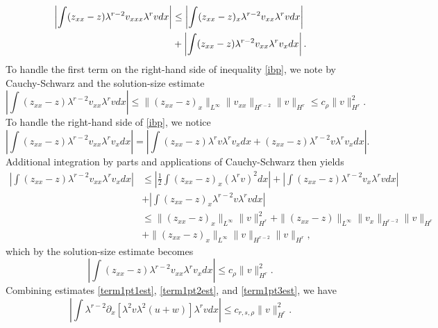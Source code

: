 \documentclass[reqno]{amsart}
\theoremstyle{plain}
\numberwithin{equation}{section}
\begin{document}
    \begin{align}\label{ibp}
        \left| \int (z_{xx}-z)\lambda^{r-2} v_{xxx}\lambda^{r}vdx \right|  & \leq \left| \int (z_{xx}-z)_x\lambda^{r-2} v_{xx}\lambda^{r}vdx \right|  \notag
        \\ & + \left| \int (z_{xx}-z)\lambda^{r-2} v_{xx}\lambda^{r}v_xdx \right|.
    \end{align} 
To handle the first term on the right-hand side of inequality \eqref{ibp}, we note by Cauchy-Schwarz and the solution-size estimate
    \[\left| \int (z_{xx}-z)\lambda^{r-2} v_{xx}\lambda^{r}vdx \right| 
        \leq \|(z_{xx}-z)_x\|_{L^{\infty}} \|v_{xx}\|_{H^{r-2}}\|v\|_{H^r} 
       \leq c_{\rho}\|v\|^2_{H^r}.\]
To handle the right-hand side of \eqref{ibp}, we notice
    \begin{equation}\label{add0}
        \left| \int (z_{xx}-z)\lambda^{r-2} v_{xx}\lambda^{r}v_xdx \right| = \left| \int (z_{xx}-z)\lambda^{r}v \lambda^{r}v_xdx + (z_{xx}-z)\lambda^{r-2} v\lambda^{r}v_xdx \right|.
    \end{equation}
Additional integration by parts and applications of Cauchy-Schwarz then yields
\begin{align*}
    \left| \int (z_{xx}-z)\lambda^{r-2} v_{xx}\lambda^{r}v_xdx \right| 
        &\leq \left| \frac12\int (z_{xx}-z)_x (\lambda^{r}v)^2dx \right| + \left| \int (z_{xx}-z)\lambda^{r-2} v_x\lambda^{r}vdx \right| 
        \\ & + \left| \int (z_{xx}-z)_x\lambda^{r-2} v\lambda^{r}vdx \right| 
            \\ &\leq \|(z_{xx}-z)_x\|_{L^{\infty}}\|v\|^2_{H^r} + \|(z_{xx}-z)\|_{L^{\infty}}\|v_{x}\|_{H^{r-2}}\|v\|_{H^r} 
            \\ & + \|(z_{xx}-z)_x\|_{L^{\infty}}\|v\|_{H^{r-2}}\|v\|_{H^r},
\end{align*}
which by the solution-size estimate  becomes
\begin{equation}\label{term1pt3est}
    \left| \int (z_{xx}-z)\lambda^{r-2} v_{xx}\lambda^{r}v_xdx \right| \leq c_{\rho}\|v\|^2_{H^r}.
\end{equation}
Combining estimates \eqref{term1pt1est}, \eqref{term1pt2est}, and \eqref{term1pt3est}, we have
\begin{equation}\label{term5}
    \left| \int \lambda^{r-2}\partial_x\left[\lambda^2v\lambda^2(u+w)\right] \lambda^{r}vdx\right|
        \leq c_{r,s,\rho}\|v\|^2_{H^r}.
\end{equation}
\end{document}
